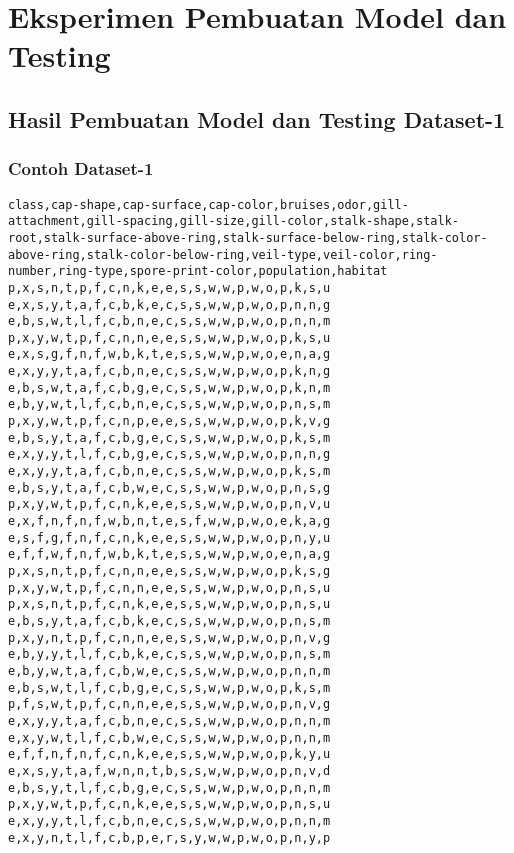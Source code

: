 \chapter{Eksperimen Pembuatan Model dan Testing}
\label{lamp:E}

\section{Hasil Pembuatan Model dan Testing Dataset-1}
\label{lamp:E-Hasil Pembuatan Model dan Testing Dataset-1}

\subsection{Contoh Dataset-1}
\label{lamp:E-Contoh Datase1-1}
\begin{lstlisting}
class,cap-shape,cap-surface,cap-color,bruises,odor,gill-attachment,gill-spacing,gill-size,gill-color,stalk-shape,stalk-root,stalk-surface-above-ring,stalk-surface-below-ring,stalk-color-above-ring,stalk-color-below-ring,veil-type,veil-color,ring-number,ring-type,spore-print-color,population,habitat
p,x,s,n,t,p,f,c,n,k,e,e,s,s,w,w,p,w,o,p,k,s,u
e,x,s,y,t,a,f,c,b,k,e,c,s,s,w,w,p,w,o,p,n,n,g
e,b,s,w,t,l,f,c,b,n,e,c,s,s,w,w,p,w,o,p,n,n,m
p,x,y,w,t,p,f,c,n,n,e,e,s,s,w,w,p,w,o,p,k,s,u
e,x,s,g,f,n,f,w,b,k,t,e,s,s,w,w,p,w,o,e,n,a,g
e,x,y,y,t,a,f,c,b,n,e,c,s,s,w,w,p,w,o,p,k,n,g
e,b,s,w,t,a,f,c,b,g,e,c,s,s,w,w,p,w,o,p,k,n,m
e,b,y,w,t,l,f,c,b,n,e,c,s,s,w,w,p,w,o,p,n,s,m
p,x,y,w,t,p,f,c,n,p,e,e,s,s,w,w,p,w,o,p,k,v,g
e,b,s,y,t,a,f,c,b,g,e,c,s,s,w,w,p,w,o,p,k,s,m
e,x,y,y,t,l,f,c,b,g,e,c,s,s,w,w,p,w,o,p,n,n,g
e,x,y,y,t,a,f,c,b,n,e,c,s,s,w,w,p,w,o,p,k,s,m
e,b,s,y,t,a,f,c,b,w,e,c,s,s,w,w,p,w,o,p,n,s,g
p,x,y,w,t,p,f,c,n,k,e,e,s,s,w,w,p,w,o,p,n,v,u
e,x,f,n,f,n,f,w,b,n,t,e,s,f,w,w,p,w,o,e,k,a,g
e,s,f,g,f,n,f,c,n,k,e,e,s,s,w,w,p,w,o,p,n,y,u
e,f,f,w,f,n,f,w,b,k,t,e,s,s,w,w,p,w,o,e,n,a,g
p,x,s,n,t,p,f,c,n,n,e,e,s,s,w,w,p,w,o,p,k,s,g
p,x,y,w,t,p,f,c,n,n,e,e,s,s,w,w,p,w,o,p,n,s,u
p,x,s,n,t,p,f,c,n,k,e,e,s,s,w,w,p,w,o,p,n,s,u
e,b,s,y,t,a,f,c,b,k,e,c,s,s,w,w,p,w,o,p,n,s,m
p,x,y,n,t,p,f,c,n,n,e,e,s,s,w,w,p,w,o,p,n,v,g
e,b,y,y,t,l,f,c,b,k,e,c,s,s,w,w,p,w,o,p,n,s,m
e,b,y,w,t,a,f,c,b,w,e,c,s,s,w,w,p,w,o,p,n,n,m
e,b,s,w,t,l,f,c,b,g,e,c,s,s,w,w,p,w,o,p,k,s,m
p,f,s,w,t,p,f,c,n,n,e,e,s,s,w,w,p,w,o,p,n,v,g
e,x,y,y,t,a,f,c,b,n,e,c,s,s,w,w,p,w,o,p,n,n,m
e,x,y,w,t,l,f,c,b,w,e,c,s,s,w,w,p,w,o,p,n,n,m
e,f,f,n,f,n,f,c,n,k,e,e,s,s,w,w,p,w,o,p,k,y,u
e,x,s,y,t,a,f,w,n,n,t,b,s,s,w,w,p,w,o,p,n,v,d
e,b,s,y,t,l,f,c,b,g,e,c,s,s,w,w,p,w,o,p,n,n,m
p,x,y,w,t,p,f,c,n,k,e,e,s,s,w,w,p,w,o,p,n,s,u
e,x,y,y,t,l,f,c,b,n,e,c,s,s,w,w,p,w,o,p,n,n,m
e,x,y,n,t,l,f,c,b,p,e,r,s,y,w,w,p,w,o,p,n,y,p
\end{lstlisting}



